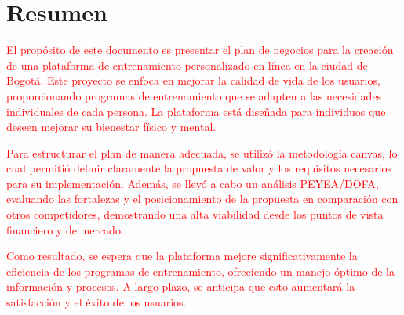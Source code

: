 \section*{Resumen}
\noindent 


\textcolor{red}{El propósito de este documento es presentar el plan de negocios para la creación de una plataforma de entrenamiento personalizado en línea en la ciudad de Bogotá. Este proyecto se enfoca en  mejorar la calidad de vida de los usuarios, proporcionando programas de entrenamiento que se adapten a las necesidades individuales de cada persona. La plataforma está diseñada para individuos que deseen mejorar su bienestar físico y mental. }

\textcolor{red}{Para estructurar el plan de manera adecuada, se utilizó la metodología canvas, lo cual permitió definir claramente la propuesta de valor y los requisitos necesarios para su implementación. Además,  se llevó a cabo un análisis PEYEA/DOFA, evaluando las fortalezas y el posicionamiento de la propuesta en comparación con otros competidores, demostrando una alta viabilidad desde los puntos de vista financiero y de mercado.}

\textcolor{red}{Como resultado, se espera que la plataforma mejore significativamente la eficiencia de los programas de entrenamiento, ofreciendo un manejo óptimo de la información y procesos. A largo plazo, se anticipa que esto aumentará la satisfacción y el éxito de los usuarios. }
